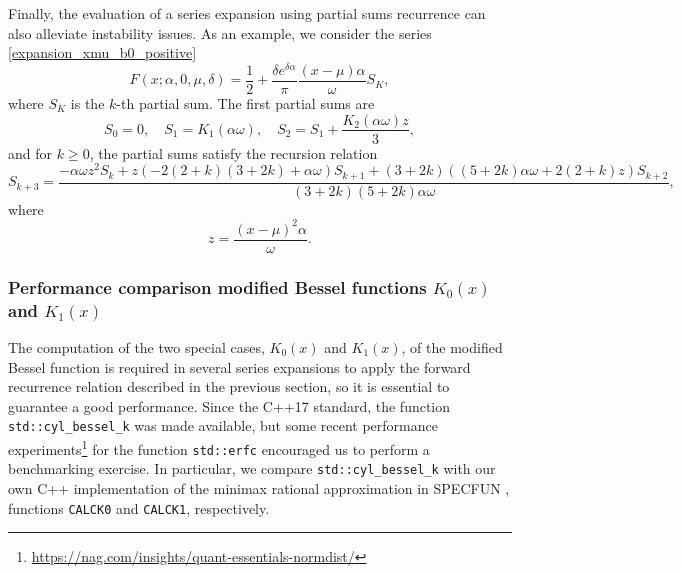 \documentclass[10pt,a4paper,oneside]{article}
\numberwithin{equation}{section}
\begin{document}
Finally, the evaluation of a series expansion using partial sums recurrence can also alleviate instability issues. As an example, we consider the series \eqref{expansion_xmu_b0_positive}
\begin{equation}
F(x;\alpha, 0, \mu, \delta) = \frac{1}{2} + \frac{\delta e^{\delta \alpha}}{\pi}\frac{(x-\mu) \alpha}{\omega}S_K,
\end{equation}
where $S_K$ is the $k$-th partial sum. The first partial sums are
\begin{equation}
S_0 = 0, \quad S_1 = K_1(\alpha \omega), \quad S_2 = S_1 + \frac{K_2(\alpha \omega)z}{3},
\end{equation}
and for $k \ge 0$, the partial sums satisfy the recursion relation
\begin{equation}
S_{k+3} = \frac{-\alpha\omega z^2 S_k + z \left(-2 (2+k) (3 + 2k) + \alpha\omega\right) S_{k+1} + (3 + 2k) \left((5 + 2k) \alpha\omega + 2(2+k)z\right) S_{k+2}}{(3 + 2k) (5 + 2k) \alpha \omega},
\end{equation}
where
\begin{equation}
z = \frac{(x-\mu)^2 \alpha}{\omega}.
\end{equation}
%

\subsubsection{Performance comparison modified Bessel functions $K_0(x)$ and $K_1(x)$}
The computation of the two special cases, $K_0(x)$ and $K_1(x)$, of the modified Bessel function is required in several series expansions to apply the forward recurrence relation described in the previous section, so it is essential to guarantee a good performance. Since the C++17 standard, the function \texttt{std::cyl\_bessel\_k} was made available, but some recent performance experiments\footnote{\url{https://nag.com/insights/quant-essentials-normdist/}} for the function \texttt{std::erfc} encouraged us to perform a benchmarking exercise. In particular, we compare \texttt{std::cyl\_bessel\_k} with our own C++ implementation of the minimax rational approximation in SPECFUN \cite{Cody1993}, functions \texttt{CALCK0} and \texttt{CALCK1}, respectively.
\end{document}
